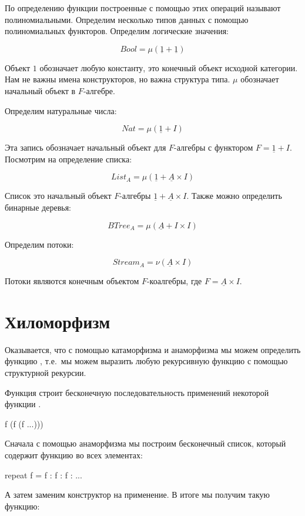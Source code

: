 По определению функции построенные с помощью этих операций
называют полиномиальными. 
Определим несколько типов данных с помощью полиномиальных
функторов. Определим логические значения:

\[ Bool = \mu(\underline{1} + \underline{1}) \]

Объект $1$ обозначает любую константу, это конечный объект
исходной категории. Нам не важны имена конструкторов,
но важна структура типа. $\mu$ обозначает начальный объект
в $F$-алгебре. 

Определим натуральные числа:

\[ Nat = \mu(\underline{1} + I) \]

Эта запись обозначает начальный объект для $F$-алгебры
с функтором $F=\underline{1}+I$. 
Посмотрим на определение списка:

\[ List_A = \mu(\underline{1} + \underline{A} \times I) \]

Список это начальный объект $F$-алгебры 
$\underline{1}+\underline{A}\times I$. 
Также можно определить бинарные деревья:

\[ BTree_A = \mu(\underline{A} + I \times I )\]

Определим потоки:

\[ Stream_A = \nu (\underline{A} \times I) \]

Потоки являются конечным объектом $F$-коалгебры, 
где $F= \underline{A} \times I$.

\section{Хиломорфизм}

Оказывается, что с помощью катаморфизма и анаморфизма
мы можем определить функцию , т.е.~мы можем
выразить любую рекурсивную функцию с помощью структурной
рекурсии. 

Функция  строит бесконечную последовательность
применений некоторой функции . 

\begin{code}
f (f (f ...)))
\end{code}

Сначала с помощью анаморфизма мы построим бесконечный список, 
который содержит функцию  во всех элементах:

\begin{code}
repeat f = f : f : f : ...
\end{code}

А затем заменим конструктор \In{:} на применение.
В итоге мы получим такую функцию:


